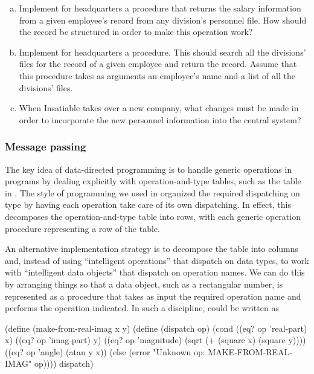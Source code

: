 \begin{exerciseGroup}
\begin{enumerate}[a.]
\item
Implement for headquarters a  procedure that returns the
salary information from a given employee's record from any division's personnel
file.  How should the record be structured in order to make this operation
work?

\item
Implement for headquarters a  procedure.  This
should search all the divisions' files for the record of a given employee and
return the record.  Assume that this procedure takes as arguments an employee's
name and a list of all the divisions' files.

\item
When Insatiable takes over a new company, what changes must be made in order to
incorporate the new personnel information into the central system?

\end{enumerate}
\end{exerciseGroup}

\subsubsection*{Message passing}

The key idea of data-directed programming is to handle generic operations in
programs by dealing explicitly with operation-and-type tables, such as the
table in .  The style of programming we used in
 organized the required dispatching on type by having each operation
take care of its own dispatching.  In effect, this decomposes the
operation-and-type table into rows, with each generic operation procedure
representing a row of the table.

An alternative implementation strategy is to decompose the table into columns
and, instead of using ``intelligent operations'' that dispatch on data types,
to work with ``intelligent data objects'' that dispatch on operation names.  We
can do this by arranging things so that a data object, such as a rectangular
number, is represented as a procedure that takes as input the required
operation name and performs the operation indicated.  In such a discipline,
 could be written as

\begin{codeBlock}
(define (make-from-real-imag x y)
  (define (dispatch op)
    (cond ((eq? op 'real-part) x)
          ((eq? op 'imag-part) y)
          ((eq? op 'magnitude) (sqrt (+ (square x)
                                        (square y))))
          ((eq? op 'angle) (atan y x))
          (else
            (error "Unknown op: MAKE-FROM-REAL-IMAG"
                   op))))
  dispatch)
\end{codeBlock}

